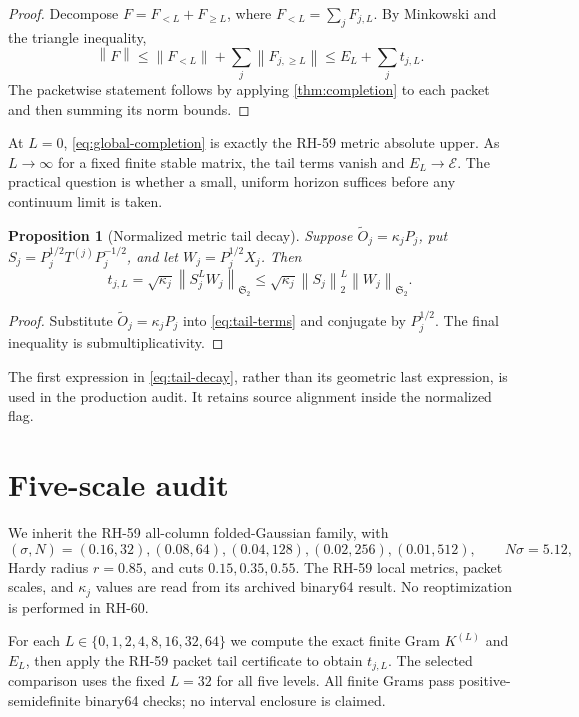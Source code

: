 \documentclass[11pt]{article}
\newtheorem{proposition}[theorem]{Proposition}
\theoremstyle{remark}
\newcommand{\norm}[1]{\left\lVert#1\right\rVert}
\newcommand{\HS}{\mathfrak S_2}
\newcommand{\cE}{\mathcal E}
\begin{document}
\begin{proof}
Decompose $F=F_{<L}+F_{\ge L}$, where
$F_{<L}=\sum_jF_{j,L}$.  By Minkowski and the triangle inequality,
\[
 \norm F\le\norm{F_{<L}}+\sum_j\norm{F_{j,\ge L}}
 \le E_L+\sum_jt_{j,L}.
\]
The packetwise statement follows by applying
\cref{thm:completion} to each packet and then summing its norm bounds.
\end{proof}

At $L=0$, \eqref{eq:global-completion} is exactly the RH-59 metric absolute
upper.  As $L\to\infty$ for a fixed finite stable matrix, the tail terms
vanish and $E_L\to\cE$.  The practical question is whether a small, uniform
horizon suffices before any continuum limit is taken.

\begin{proposition}[Normalized metric tail decay]
\label{prop:tail-decay}
Suppose $\widetilde O_j=\kappa_jP_j$, put
$S_j=P_j^{1/2}T^{(j)}P_j^{-1/2}$, and let
$W_j=P_j^{1/2}X_j$.  Then
\begin{equation}
 t_{j,L}=\sqrt{\kappa_j}\norm{S_j^LW_j}_{\HS}
 \le\sqrt{\kappa_j}\norm{S_j}_2^L\norm{W_j}_{\HS}.
 \label{eq:tail-decay}
\end{equation}
\end{proposition}

\begin{proof}
Substitute $\widetilde O_j=\kappa_jP_j$ into
\eqref{eq:tail-terms} and conjugate by $P_j^{1/2}$.  The final inequality is
submultiplicativity.
\end{proof}

The first expression in \eqref{eq:tail-decay}, rather than its geometric
last expression, is used in the production audit.  It retains source
alignment inside the normalized flag.

\section{Five-scale audit}
\label{sec:audit}

We inherit the RH-59 all-column folded-Gaussian family, with
\[
 (\sigma,N)=(0.16,32),(0.08,64),(0.04,128),(0.02,256),(0.01,512),
 \qquad N\sigma=5.12,
\]
Hardy radius $r=0.85$, and cuts $0.15,0.35,0.55$.  The RH-59 local metrics,
packet scales, and $\kappa_j$ values are read from its archived binary64
result.  No reoptimization is performed in RH-60.

For each $L\in\{0,1,2,4,8,16,32,64\}$ we compute the exact finite Gram
$K^{(L)}$ and $E_L$, then apply the RH-59 packet tail certificate to obtain
$t_{j,L}$.  The selected comparison uses the fixed $L=32$ for all five
levels.  All finite Grams pass positive-semidefinite binary64 checks; no
interval enclosure is claimed.
\end{document}
